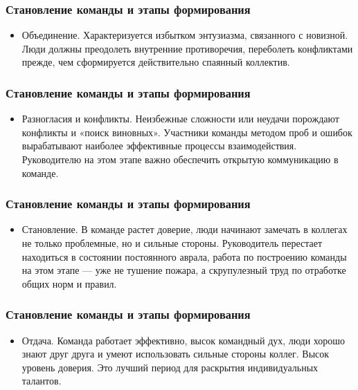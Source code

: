 \documentclass{../industrial-development}
\begin{document}
\begin{frame} \frametitle{Становление команды и этапы формирования}

  \begin{itemize}
  \item Объединение. Характеризуется избытком энтузиазма, связанного с новизной. Люди должны преодолеть внутренние противоречия, переболеть конфликтами прежде, чем сформируется действительно спаянный коллектив.
  \end{itemize}
\end{frame}

\begin{frame} \frametitle{Становление команды и этапы формирования}
 
  \begin{itemize}
  
  \item Разногласия и конфликты. Неизбежные сложности или неудачи порождают конфликты и «поиск виновных». Участники команды методом проб и ошибок вырабатывают наиболее эффективные процессы взаимодействия. Руководителю на этом этапе важно обеспечить открытую коммуникацию в команде.
  \end{itemize}
\end{frame}

\begin{frame} \frametitle{Становление команды и этапы формирования}

  \begin{itemize}
  
  \item Становление. В команде растет доверие, люди начинают замечать в коллегах не только проблемные, но и сильные стороны. Руководитель перестает находиться в состоянии постоянного аврала, работа по построению команды на этом этапе — уже не тушение пожара, а скрупулезный труд по отработке общих норм и правил.
  \end{itemize}

\end{frame}

\begin{frame} \frametitle{Становление команды и этапы формирования}
  \begin{itemize}
  \item Отдача. Команда работает эффективно, высок командный дух, люди хорошо знают друг друга и умеют использовать сильные стороны коллег. Высок уровень доверия. Это лучший период для раскрытия индивидуальных талантов.
  \end{itemize}
\end{frame}
\end{document}
